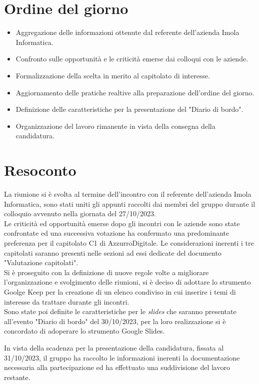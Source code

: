 \section{Ordine del giorno}
\begin{itemize}
    \item Aggregazione delle informazioni ottenute dal referente dell'azienda Imola Informatica.
    \item Confronto sulle opportunità e le criticità emerse dai colloqui con le aziende. 
	\item Formalizzazione della scelta in merito al capitolato di interesse.
	\item Aggiornamento delle pratiche realtive alla preparazione dell'ordine del giorno.
	\item Definizione delle caratteristiche per la presentazione del "Diario di bordo".
	\item Organizzazione del lavoro rimanente in vista della consegna della candidatura.
\end{itemize}

\section{Resoconto}
La riunione si è svolta al termine dell'incontro con il referente dell'azienda Imola Informatica, sono stati uniti gli appunti raccolti dai membri del gruppo durante il colloquio avvenuto nella giornata del 27/10/2023.  \\

\noindent
Le criticità ed opportunità emerse dopo gli incontri con le aziende sono state confrontate ed una successiva votazione ha confermato una predominante preferenza per il capitolato C1 di AzzurroDigitale.
Le considerazioni inerenti i tre capitolati saranno presenti nelle sezioni ad essi dedicate del documento "Valutazione capitolati". \\

\noindent
Si è proseguito con la definizione di nuove regole volte a migliorare l'organizzazione e svolgimento delle riunioni, si è deciso di adottare lo strumento Goolge Keep per la creazione di un elenco condiviso in cui inserire i temi di interesse da trattare durante gli incontri. \\
Sono state poi definite le caratteristiche per le \textit{slides} che saranno presentate all'evento "Diario di bordo" del 30/10/2023, per la loro realizzazione si è concordato di adoperare lo strumento Google Slides.

\noindent 
In vista della scadenza per la presentazione della candidatura, fissata al 31/10/2023, il gruppo ha raccolto le informazioni inerenti la documentazione necessaria alla partecipazione ed ha effettuato una suddivisione del lavoro restante.


